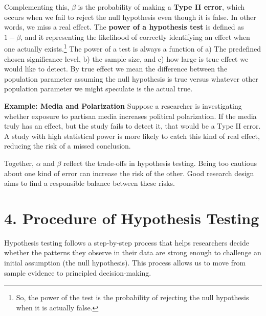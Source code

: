 \documentclass[12pt]{article}
\begin{document}
Complementing this, $\beta$ is the probability of making a \textbf{Type II error}, which occurs when we fail to reject the null hypothesis even though it is false. In other words, we miss a real effect. The \textbf{power of a hypothesis test} is defined as $1 - \beta$, and it representing the likelihood of correctly identifying an effect when one actually exists.\footnote{So, the power of the test is the probability of rejecting the null hypothesis when it is actually false.} The power of a test is always a function of a) The predefined chosen significance level, b) the sample size, and c) how large is true effect we would like to detect. By true effect we mean the difference between the population parameter assuming the null hypothesis is true versus whatever other population parameter we might speculate is the actual true. 

\textbf{Example: Media and Polarization}  
Suppose a researcher is investigating whether exposure to partisan media increases political polarization. If the media truly has an effect, but the study fails to detect it, that would be a Type II error. A study with high statistical power is more likely to catch this kind of real effect, reducing the risk of a missed conclusion.

Together, $\alpha$ and $\beta$ reflect the trade-offs in hypothesis testing. Being too cautious about one kind of error can increase the risk of the other. Good research design aims to find a responsible balance between these risks.


\section*{4. Procedure of Hypothesis Testing}

Hypothesis testing follows a step-by-step process that helps researchers decide whether the patterns they observe in their data are strong enough to challenge an initial assumption (the null hypothesis). This process allows us to move from sample evidence to principled decision-making.
\end{document}
